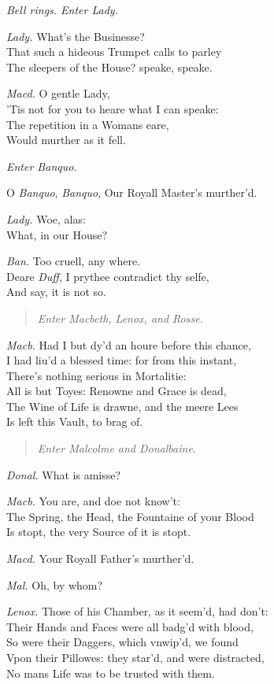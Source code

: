 \documentclass[12pt]{sides}
\newcommand{\StageDir}[1]{\begin{quote}\centering\em #1\end{quote}}
\newcommand{\clStageDir}[1]{\hspace*{\fill}\textit{#1}\hspace*{\fill}}
\newcommand{\dia}[1]{\hskip 15pt\textit{#1}\hskip 6pt}
\begin{document}
\begin{multicols}{2}
            \clStageDir{Bell rings. Enter Lady.}

            \dia{Lady.} What's the Businesse? \\ That such a hideous Trumpet calls to parley \\ The sleepers of the House? speake, speake.

            \dia{Macd.} O gentle Lady, \\ 'Tis not for you to heare what I can speake: \\ The repetition in a Womans eare, \\ Would murther as it fell.

            \clStageDir{Enter Banquo.}

            O \textit{Banquo}, \textit{Banquo}, Our Royall Master's murther'd.

            \dia{Lady.} Woe, alas: \\ What, in our House?

            \dia{Ban.} Too cruell, any where. \\ Deare \textit{Duff}, I prythee contradict thy selfe, \\ And say, it is not so.

            \StageDir{Enter Macbeth, Lenox, and Rosse.}

            \dia{Macb.} Had I but dy'd an houre before this chance, \\ I had liu'd a blessed time: for from this instant, \\ There's nothing serious in Mortalitie: \\ All is but Toyes: Renowne and Grace is dead, \\ The Wine of Life is drawne, and the meere Lees \\ Is left this Vault, to brag of.

            \StageDir{Enter Malcolme and Donalbaine.}

            \dia{Donal.} What is amisse?

            \dia{Macb.} You are, and doe not know't: \\ The Spring, the Head, the Fountaine of your Blood \\ Is stopt, the very Source of it is stopt.

            \dia{Macd.} Your Royall Father's murther'd.

            \dia{Mal.} Oh, by whom?

            \dia{Lenox.} Those of his Chamber, as it seem'd, had don't: \\ Their Hands and Faces were all badg'd with blood, \\ So were their Daggers, which vnwip'd, we found \\ Vpon their Pillowes: they star'd, and were distracted, \\ No mans Life was to be trusted with them.


\end{multicols}
\end{document}
